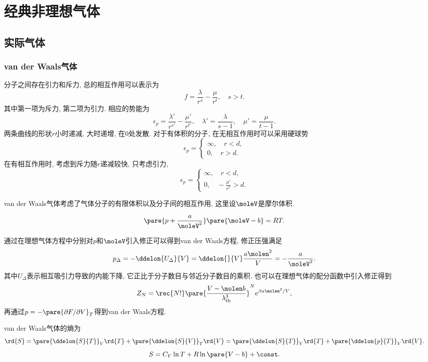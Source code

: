 \documentclass[../Thermal.tex]{subfiles}
\begin{document}
\section{经典非理想气体}
\subsection{实际气体}
\subsubsection{van der Waals气体}
\begin{remark}
	分子之间存在引力和斥力, 总的相互作用可以表示为
	\[ f = \frac{\lambda}{r^s} - \frac{\mu}{r^t},\quad  s>t. \]
	其中第一项为斥力, 第二项为引力. 相应的势能为
	\[ \epsilon_p = \frac{\lambda'}{r^{s'}} - \frac{\mu'}{r^{t'}},\quad \lambda' = \frac{\lambda}{s-1},\quad \mu' = \frac{\mu}{t-1}. \]
	两条曲线的形状$r$小时递减, 大时递增, 在$0$处发散. 对于有体积的分子, 在无相互作用时可以采用硬球势
	\[ \epsilon_p = \begin{cases} \infty,\quad r<d,\\ 0,\quad r>d.\end{cases} \]
	在有相互作用时, 考虑到斥力随$r$递减较快, 只考虑引力,
	\[ \epsilon_p = \begin{cases} \infty,\quad r<d,\\ 0,\quad -\frac{\mu'}{r^{t'}}>d.\end{cases} \]
\end{remark}
van der Waals气体考虑了气体分子的有限体积以及分子间的相互作用, 这里设$\moleV$是摩尔体积.
\begin{finale}
\begin{axiom}
\[ \pare{p + \frac{a}{\moleV^2}}\pare{\moleV - b} = RT. \]
\end{axiom}
\end{finale}
\begin{remark}
通过在理想气体方程中分别对$p$和$\moleV$引入修正可以得到van der Waals方程, 修正压强满足
\[ p_\Delta = -\ddelon{U_\Delta}{V} = \ddelon{}{V}\frac{a\molen^2}{V} = -\frac{a}{\moleV^2}. \]
其中$U_\Delta$表示相互吸引力导致的内能下降, 它正比于分子数目与邻近分子数目的乘积. 也可以在理想气体的配分函数中引入修正得到
\[ Z_N = \rec{N!}\pare{\frac{V - \molen b}{\lambda_{\mathrm{th}}^3}}^Ne^{\beta a\molen^2/V}, \]
再通过$p = -\pare{\partial F/\partial V}_T$得到van der Waals方程.
\end{remark}
\begin{ex}
van der Waals气体的熵为
\[ \rd{S} = \pare{\ddelon{S}{T}}_V\rd{T} + \pare{\ddelon{S}{V}}_T\rd{V} = \pare{\ddelon{S}{T}}_V\rd{T} + \pare{\ddelon{p}{T}}_V\rd{V}. \]
\[ S = C_V \ln T + R\ln \pare{V-b} + \const. \]
\end{ex}
\end{document}
